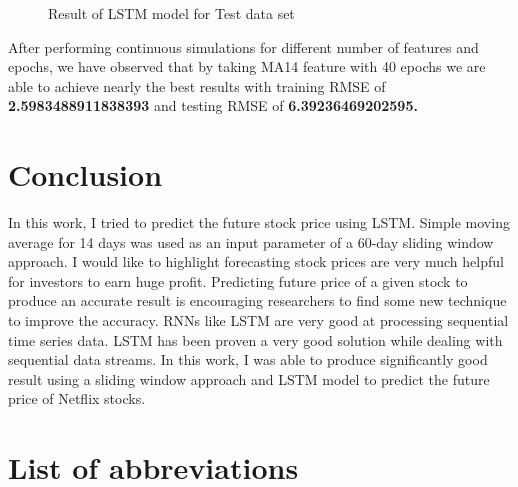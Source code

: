 \documentclass[5p,,preprint,12pt,twocolumn]{elsarticle}
\makeatletter
\def\fixFloatSize#1{}%
\makeatother
\begin{document}
\bgroup
\fixFloatSize{images/164fee09-21a5-4e60-abf9-e220aadfb1e7-u95-5-ma14-nflx-40-e.png}
\begin{figure}[!htbp]
\centering \makeatletter{}
\makeatother 
\caption{{Result of LSTM model for Test data set}}
\label{f-546de945d1f7}
\end{figure}
\egroup
After performing continuous simulations for different number of features and epochs, we have observed that by  taking MA14 feature with 40 epochs we are able to achieve  nearly the best results with training RMSE of \textbf{2.5983488911838393 } and testing RMSE of \textbf{6.39236469202595.}
    
\section{Conclusion}
In this work, I tried to predict the future stock price using LSTM. Simple moving average for 14 days was used as an input parameter of a 60-day sliding window approach. I would like to highlight forecasting stock prices are very much helpful for investors to earn huge profit. Predicting future price of a given stock to produce an accurate result is encouraging researchers to find some new technique to improve the accuracy. RNNs like LSTM are very good at processing sequential time series data. LSTM has been proven a very good solution while dealing with sequential data streams. In this work, I was able to produce significantly good result using a sliding window approach and LSTM model to predict the future price of Netflix stocks. 
    
\section{List of abbreviations}

    






\end{document}
